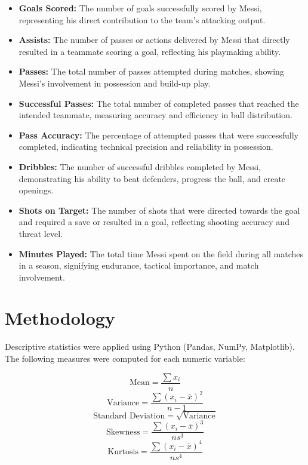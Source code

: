 \documentclass[12pt,a4paper]{report}
\begin{document}
\begin{titlepage}
\begin{itemize}
\begin{itemize}
    \item \textbf{Goals Scored:} The number of goals successfully scored by Messi, representing his direct contribution to the team's attacking output.

    \item \textbf{Assists:} The number of passes or actions delivered by Messi that directly resulted in a teammate scoring a goal, reflecting his playmaking ability.

    \item \textbf{Passes:} The total number of passes attempted during matches, showing Messi's involvement in possession and build-up play.

    \item \textbf{Successful Passes:} The total number of completed passes that reached the intended teammate, measuring accuracy and efficiency in ball distribution.

    \item \textbf{Pass Accuracy:} The percentage of attempted passes that were successfully completed, indicating technical precision and reliability in possession.

    \item \textbf{Dribbles:} The number of successful dribbles completed by Messi, demonstrating his ability to beat defenders, progress the ball, and create openings.

    \item \textbf{Shots on Target:} The number of shots that were directed towards the goal and required a save or resulted in a goal, reflecting shooting accuracy and threat level.

    \item \textbf{Minutes Played:} The total time Messi spent on the field during all matches in a season, signifying endurance, tactical importance, and match involvement.
\end{itemize}

\end{itemize}

\chapter{Methodology}
Descriptive statistics were applied using Python (Pandas, NumPy, Matplotlib). The following measures were computed for each numeric variable:

\[
\text{Mean} = \frac{\sum x_i}{n}
\]
\[
\text{Variance} = \frac{\sum (x_i - \bar{x})^2}{n-1}
\]
\[
\text{Standard Deviation} = \sqrt{\text{Variance}}
\]
\[
\text{Skewness} = \frac{\sum (x_i - \bar{x})^3}{ns^3}
\]
\[
\text{Kurtosis} = \frac{\sum (x_i - \bar{x})^4}{ns^4}
\]


\end{titlepage}
\end{document}
